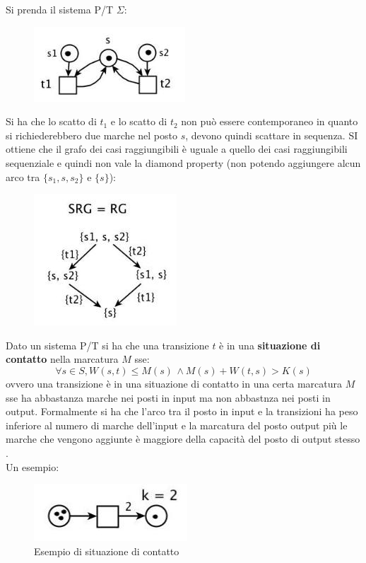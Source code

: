 \documentclass[a4paper,12pt, oneside]{book}
\begin{document}
\begin{esempio}
  Si prenda il sistema P/T $\Sigma$:
  \begin{figure}[H]
    \centering
    \includegraphics[scale = 0.7]{img/pt31.jpg} 
  \end{figure}
  \newpage
  Si ha che lo scatto di $t_1$ e lo scatto di $t_2$ non può essere contemporaneo
  in quanto si richiederebbero due marche nel posto $s$, devono quindi scattare
  in sequenza. SI ottiene che il grafo dei casi raggiungibili è uguale a quello
  dei casi raggiungibili sequenziale e quindi non vale la diamond property (non
  potendo aggiungere alcun arco tra $\{s_1,s,s_2\}$ e $\{s\}$):
  \begin{figure}[H]
    \centering
    \includegraphics[scale = 0.7]{img/pt32.jpg}
  \end{figure}
\end{esempio}
\begin{definizione}
  Dato un sistema P/T si ha che una transizione $t$ è in una \textbf{situazione
    di contatto} nella marcatura $M$ sse:
  \[\forall s\in S, W(s,t)\leq M(s)\,\wedge M(s)+W(t,s)>K(s)\]
  ovvero una transizione è in una situazione di contatto in una certa marcatura
  $M$ sse ha abbastanza marche nei posti in input ma non abbastnza nei posti in
  output. Formalmente si ha che l'arco tra il posto in input e la transizioni ha
  peso inferiore al numero di marche dell'input e la marcatura del posto output
  più le marche che vengono aggiunte è maggiore della capacità del posto di
  output stesso .\\
  Un esempio:
  \begin{figure}[H]
    \centering
    \includegraphics[scale = 0.65]{img/pt33.jpg}
    \caption{Esempio di situazione di contatto}
  \end{figure}
\end{definizione}
\end{document}
